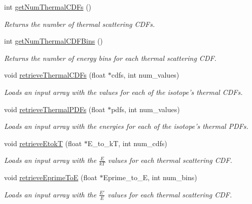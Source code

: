 \begin{DoxyCompactItemize}
int \hyperlink{classIsotope_ab40c21c20dee2ce8ef5141c000076231}{get\-Num\-Thermal\-C\-D\-Fs} ()
\begin{DoxyCompactList}\small\item\em Returns the number of thermal scattering C\-D\-Fs. \end{DoxyCompactList}\item 
int \hyperlink{classIsotope_a6cbecbd23de6df5f156cb4b747de469f}{get\-Num\-Thermal\-C\-D\-F\-Bins} ()
\begin{DoxyCompactList}\small\item\em Returns the number of energy bins for each thermal scattering C\-D\-F. \end{DoxyCompactList}\item 
void \hyperlink{classIsotope_a872fb353ee035c3514fd7a0662f9ce4d}{retrieve\-Thermal\-C\-D\-Fs} (float $\ast$cdfs, int num\-\_\-values)
\begin{DoxyCompactList}\small\item\em Loads an input array with the values for each of the isotope's thermal C\-D\-Fs. \end{DoxyCompactList}\item 
void \hyperlink{classIsotope_abb9e5754658ea5e02556a998186f8161}{retrieve\-Thermal\-P\-D\-Fs} (float $\ast$pdfs, int num\-\_\-values)
\begin{DoxyCompactList}\small\item\em Loads an input array with the energies for each of the isotope's thermal P\-D\-Fs. \end{DoxyCompactList}\item 
void \hyperlink{classIsotope_a50f48611e87e42fd727223676a6d6f5a}{retrieve\-Etok\-T} (float $\ast$E\-\_\-to\-\_\-k\-T, int num\-\_\-cdfs)
\begin{DoxyCompactList}\small\item\em Loads an input array with the $ \frac{E}{kT} $ values for each thermal scattering C\-D\-F. \end{DoxyCompactList}\item 
void \hyperlink{classIsotope_a59bc39b34459d9261fdcf557c1677f70}{retrieve\-Eprime\-To\-E} (float $\ast$Eprime\-\_\-to\-\_\-\-E, int num\-\_\-bins)
\begin{DoxyCompactList}\small\item\em Loads an input array with the $ \frac{E'}{E} $ values for each thermal scattering C\-D\-F. \end{DoxyCompactList}\end{DoxyCompactItemize}


